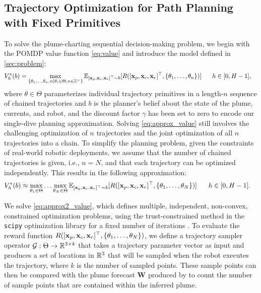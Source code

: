 \subsection{Trajectory Optimization for Path Planning with Fixed Primitives}
\label{sec:to}

To solve the plume-charting sequential decision-making problem, we begin with the POMDP value function \cref{eq:value} and introduce the model defined in \cref{sec:problem}:
\begin{align}
     V_h^{*}(b) &=  \max_{\{\theta_1, \dots, \theta_n, n \mid \theta_i \in \Theta, n \in \mathbb{Z}^+\}} \mathbb{E}_{[\mathbf{x}_{p}, \mathbf{x}_{c}, \mathbf{x}_{r}]^\top \sim b}[R([\mathbf{x}_{p}, \mathbf{x}_{c}, \mathbf{x}_{r}]^\top, \{\theta_1, \dots, \theta_n\})] \hspace{0.6cm} h \in [0, H-1],
    \label{eq:approx_value}
\end{align}
where $\theta \in \Theta$ parameterizes individual trajectory primitives in a length-$n$ sequence of chained trajectories and $b$ is the planner's belief about the state of the plume, currents, and robot, and the discount factor $\gamma$ has been set to zero to encode our single-dive planning approximation. Solving \cref{eq:approx_value} still involves the challenging optimization of $n$ trajectories and the joint optimization of all $n$ trajectories into a chain. To simplify the planning problem, given the constraints of real-world robotic deployments, we assume that the number of chained trajectories is given, i.e., $n=N$, and that each trajectory can be optimized independently. This results in the following approximation:
\begin{align}
     V_h^{*}(b) &\approx  \max_{\theta_1 \in \Theta} \dots \max_{\theta_N\in \Theta} \mathbb{E}_{[\mathbf{x}_{p}, \mathbf{x}_{c}, \mathbf{x}_{r}]^\top \sim b}[R([\mathbf{x}_{p}, \mathbf{x}_{c}, \mathbf{x}_{r}]^\top, \{\theta_1, \dots, \theta_N\})] \hspace{0.6cm} h \in [0, H-1].
    \label{eq:approx2_value}
\end{align}

We solve \cref{eq:approx2_value}, which defines multiple, independent, non-convex, constrained optimization problems, using the trust-constrained method in the \texttt{scipy} optimization library for a fixed number of iterations \cite{conn2000trust}. To evaluate the reward function $R([\mathbf{x}_{p}, \mathbf{x}_{c}, \mathbf{x}_{r}]^\top, \{\theta_1, \dots, \theta_N\})$, we define a trajectory sampler operator $\mathcal{G}: \Theta \to \mathbb{R}^{3 \times k}$ that takes a trajectory parameter vector as input and produces a set of locations in $\mathbb{R}^3$ that will be sampled when the robot executes the trajectory, where $k$ is the number of sampled points. These sample points can then be compared with the plume forecast $\mathbf{W}$ produced by \PHUMES to count the number of sample points that are contained within the inferred plume.

